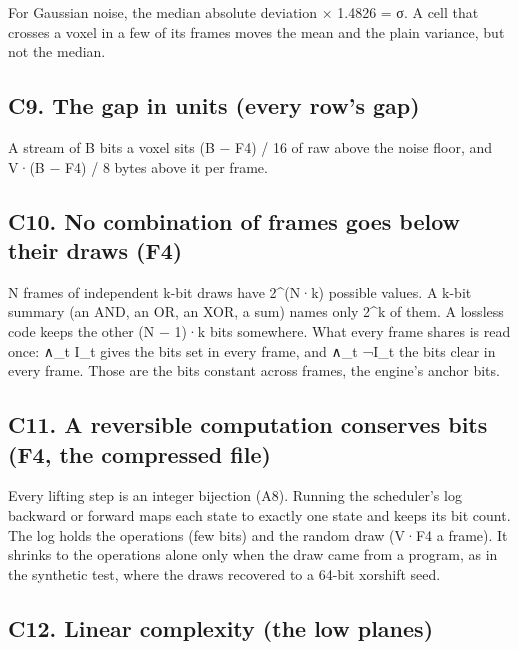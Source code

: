For Gaussian noise, the median absolute deviation × 1.4826 = σ. A cell that crosses a voxel in a few of its frames moves the mean and the plain variance, but not the median.

\subsection{\texorpdfstring{C9. The gap in units (every row's gap)}{C9. The gap in units (every row's gap)}}

A stream of B bits a voxel sits (B − F4) / 16 of raw above the noise floor, and V·(B − F4) / 8 bytes above it per frame.

\subsection{\texorpdfstring{C10. No combination of frames goes below their draws (F4)}{C10. No combination of frames goes below their draws (F4)}}

N frames of independent k-bit draws have 2\textasciicircum{}(N·k) possible values. A k-bit summary (an AND, an OR, an XOR, a sum) names only 2\textasciicircum{}k of them. A lossless code keeps the other (N − 1)·k bits somewhere. What every frame shares is read once: ∧\_\allowbreak{}t I\_\allowbreak{}t gives the bits set in every frame, and ∧\_\allowbreak{}t ¬I\_\allowbreak{}t the bits clear in every frame. Those are the bits constant across frames, the engine's anchor bits.

\subsection{\texorpdfstring{C11. A reversible computation conserves bits (F4, the compressed file)}{C11. A reversible computation conserves bits (F4, the compressed file)}}

Every lifting step is an integer bijection (A8). Running the scheduler's log backward or forward maps each state to exactly one state and keeps its bit count. The log holds the operations (few bits) and the random draw (V·F4 a frame). It shrinks to the operations alone only when the draw came from a program, as in the synthetic test, where the draws recovered to a 64-bit xorshift seed.

\subsection{\texorpdfstring{C12. Linear complexity (the low planes)}{C12. Linear complexity (the low planes)}}

